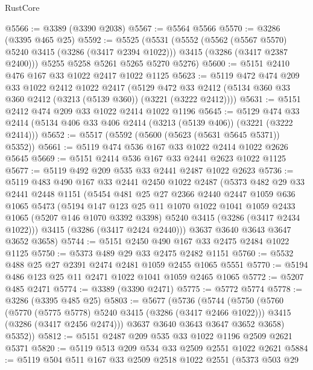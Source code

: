 \begin{lexlean}{RustCore}
\begin{coremodule}
@5566 := @3389 (@3390 @2038)
@5567 := @5564 @5566
@5570 := @3286 (@3395 @465 @25)
@5592 := @5525
    (@5531
      (@5552
        (@5562 (@5567 @5570) @5240 @3415 (@3286 (@3417 @2394 @1022)))
        @3415
        (@3286 (@3417 @2387 @2400)))
      @5255
      @5258
      @5261
      @5265
      @5270
      @5276)
@5600 := @5151 @2410 @476 @167 @33 @1022 @2417 @1022 @1125
@5623 := @5119
    @472
    @474
    @209
    @33
    @1022
    @2412
    @1022
    @2417
    (@5129 @472 @33 @2412 (@5134 @360 @33 @360 @2412 (@3213 (@5139 @360)) (@3221 (@3222 @2412))))
@5631 := @5151 @2412 @474 @209 @33 @1022 @2414 @1022 @1196
@5645 := @5129 @474 @33 @2414 (@5134 @406 @33 @406 @2414 (@3213 (@5139 @406)) (@3221 (@3222 @2414)))
@5652 := @5517 (@5592 (@5600 (@5623 (@5631 @5645 @5371)) @5352))
@5661 := @5119 @474 @536 @167 @33 @1022 @2414 @1022 @2626 @5645
@5669 := @5151 @2414 @536 @167 @33 @2441 @2623 @1022 @1125
@5677 := @5119 @492 @209 @535 @33 @2441 @2487 @1022 @2623
@5736 := @5119
    @483
    @490
    @167
    @33
    @2441
    @2450
    @1022
    @2487
    (@5373
      @482
      @29
      @33
      @2441
      @2448
      @1151
      (@5454
        @481
        @25
        @27
        @2366
        @2440
        @2447
        @1059
        @636
        @1065
        @5473
        (@5194
          @147
          @123
          @25
          @11
          @1070
          @1022
          @1041
          @1059
          @2433
          @1065
          (@5207 @146 @1070 @3392 @3398)
          @5240
          @3415
          (@3286 (@3417 @2434 @1022)))
        @3415
        (@3286 (@3417 @2424 @2440)))
      @3637
      @3640
      @3643
      @3647
      @3652
      @3658)
@5744 := @5151 @2450 @490 @167 @33 @2475 @2484 @1022 @1125
@5750 := @5373 @489 @29 @33 @2475 @2482 @1151
@5760 := @5532 @488 @25 @27 @2391 @2474 @2481 @1059 @2455 @1065 @5551
@5770 := @5194 @486 @123 @25 @11 @2471 @1022 @1041 @1059 @2465 @1065
@5772 := @5207 @485 @2471
@5774 := @3389 (@3390 @2471)
@5775 := @5772 @5774
@5778 := @3286 (@3395 @485 @25)
@5803 := @5677
    (@5736
      (@5744
        (@5750
          (@5760
            (@5770 (@5775 @5778) @5240 @3415 (@3286 (@3417 @2466 @1022)))
            @3415
            (@3286 (@3417 @2456 @2474)))
          @3637
          @3640
          @3643
          @3647
          @3652
          @3658)
        @5352))
@5812 := @5151 @2487 @209 @535 @33 @1022 @1196 @2509 @2621 @5371
@5820 := @5119 @513 @209 @534 @33 @2509 @2551 @1022 @2621
@5884 := @5119
    @504
    @511
    @167
    @33
    @2509
    @2518
    @1022
    @2551
    (@5373
      @503
      @29

\end{coremodule}
\end{lexlean}

